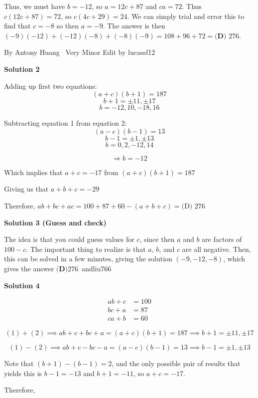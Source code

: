 \begin{enumerate}
 Thus, we must have $b=-12$, so $a=12c+87$ and $ca=72$. Thus $c(12c+87)=72$, so $c(4c+29)=24$. We can simply trial and error this to find that $c=-8$ so then $a=-9$. The answer is then $(-9)(-12)+(-12)(-8)+(-8)(-9)=108+96+72=\boxed{\textbf{(D) }276}$.

 By Antony Huang ~Very Minor Edit by lucassf12

 



\textbf{Solution 2}

Adding up first two equations: 
 \[(a+c)(b+1)=187\]
 \[b+1=\pm 11,\pm 17\]
 \[b=-12,10,-18,16\]

 Subtracting equation 1 from equation 2: 
 \[(a-c)(b-1)=13\]
 \[b-1=\pm 1,\pm 13\]
 \[b=0,2,-12,14\]

 \[\Rightarrow b=-12\]

 Which implies that $a+c=-17$ from $(a+c)(b+1)=187$

 Giving us that $a+b+c=-29$

 Therefore, $ab+bc+ac=100+87+60-(a+b+c)=\boxed{\text{(D) }276}$




\textbf{Solution 3 (Guess and check)}

The idea is that you could guess values for $c$, since then $a$ and $b$ are factors of $100 - c$. The important thing to realize is that $a$, $b$, and $c$ are all negative. Then, this can be solved in a few minutes, giving the solution $(-9, -12, -8)$, which gives the answer $\boxed{\textbf{(D)} 276}$~andliu766

 


 



\textbf{Solution 4}


 \begin{align} ab + c &= 100 \\ bc + a &= 87 \\ ca + b &= 60 \end{align}

 \[(1) + (2) \implies  ab + c +bc + a = (a+c)(b+1)=187\implies b+1=\pm 11,\pm 17\]

 \[(1) - (2) \implies ab + c - bc - a = (a-c)(b-1)=13\implies b-1=\pm 1,\pm 13\]

 Note that $(b+1)-(b-1)=2$, and the only possible pair of results that yields this is $b-1=-13$ and $b+1=-11$, so $a+c=-17$. 

 Therefore, 

 




\end{enumerate}
